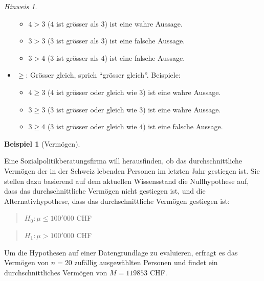 \documentclass[
]{book}
\providecommand{\tightlist}{%
  \setlength{\itemsep}{0pt}\setlength{\parskip}{0pt}}
\theoremstyle{definition}
\theoremstyle{definition}
\newtheorem{example}{Beispiel}[chapter]
\theoremstyle{definition}
\theoremstyle{definition}
\theoremstyle{remark}
\newtheorem*{remark}{Hinweis}
\begin{document}
\begin{caution}
\begin{remark}
\begin{itemize}
  \begin{itemize}
  \tightlist
  \item
    \(4 > 3\) (\(4\) ist grösser als \(3\)) ist eine wahre Aussage.
  \item
    \(3 > 3\) (\(3\) ist grösser als \(3\)) ist eine falsche Aussage.
  \item
    \(3 > 4\) (\(3\) ist grösser als \(4\)) ist eine falsche Aussage.
  \end{itemize}
\item
  \(\geq\): Grösser gleich, sprich ``grösser gleich''. Beispiele:

  \begin{itemize}
  \tightlist
  \item
    \(4 \geq 3\) (\(4\) ist grösser oder gleich wie \(3\)) ist eine wahre Aussage.
  \item
    \(3 \geq 3\) (\(3\) ist grösser oder gleich wie \(3\)) ist eine wahre Aussage.
  \item
    \(3 \geq 4\) (\(3\) ist grösser oder gleich wie \(4\)) ist eine falsche Aussage.
  \end{itemize}
\end{itemize}

\end{remark}

\end{caution}

\begin{example}[Vermögen]
\protect\hypertarget{exm:vermoegen}{}\label{exm:vermoegen}\leavevmode

Eine Sozialpolitikberatungsfirma will herausfinden, ob das durchschnittliche Vermögen der in der Schweiz lebenden Personen im letzten Jahr gestiegen ist. Sie stellen dazu basierend auf dem aktuellen Wissensstand die Nullhypothese auf, dass das durchschnittliche Vermögen nicht gestiegen ist, und die Alternativhypothese, dass das durchschnittliche Vermögen gestiegen ist:

\begin{quote}
\(H_0: \mu \leq 100'000\) CHF
\end{quote}

\begin{quote}
\(H_1: \mu > 100'000\) CHF
\end{quote}

Um die Hypothesen auf einer Datengrundlage zu evaluieren, erfragt es das Vermögen von \(n=20\) zufällig ausgewählten Personen und findet ein durchschnittliches Vermögen von \(M=119853\) CHF.

\end{example}
\end{document}
